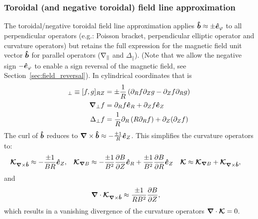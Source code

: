 
\subsubsection{Toroidal (and negative toroidal) field line approximation}\label{sec:torfieldlineapprox}
The toroidal/negative toroidal field line approximation applies \(\bm{\hat{b}}\approx \pm \bm{\hat{e}}_\varphi\) to all perpendicular operators
(e.g.: Poisson bracket, perpendicular elliptic operator and curvature operators)
but retains the full expression for the magnetic field unit vector \(\bm{\hat{b}}\)
for parallel operators (\(\nabla_\parallel\) and \(\Delta_\parallel\)).
(Note that we allow the negative sign $-\bm{\hat{e}}_\varphi$ to enable a sign reversal of the magnetic field, see Section~\ref{sec:field_reversal}).
In cylindrical coordinates that is
\begin{align}
[f,g]_\perp \equiv [f,g]_{RZ} &= \pm\frac{1}{R} \left(\partial_R f\partial_Z g - \partial_Z f\partial_R g\right) \\
\np f &= \partial_R f \ehat_R + \partial_Z f \ehat_Z \\
\Delta_\perp f &= \frac{1}{R}\partial_R \left( R \partial_R f\right) + \partial_Z(\partial_Z f)
\label{}
\end{align}
The curl of $\bm{\hat{b}}$ reduces to
 ${\boldsymbol{\nabla}}\times\bm{\hat{b}} \approx -  \frac{\pm 1}{R} \bm{\hat{e}}_Z$.
This simplifies the curvature operators to:
\begin{align}
{\boldsymbol{\mathcal{K}}}_{{{\boldsymbol{\nabla}}\times\bm{\hat{b}}}}  &\approx  -  \frac{\pm 1}{B R} \bm{\hat{e}}_Z , &
{\boldsymbol{ \mathcal{K} }}_{{\boldsymbol{\nabla}}  B}  &\approx  -\frac{\pm 1}{B^2}\frac{\partial B}{\partial Z}\bm{\hat{e}}_R +\frac{\pm 1}{B^2} \frac{\partial B}{\partial R}\bm{\hat{e}}_Z &
{\boldsymbol{ \mathcal{K} }} &\approx {\boldsymbol{ \mathcal{K} }}_{{\boldsymbol{\nabla}}  B}  +{\boldsymbol{ \mathcal{K} }}_{{{\boldsymbol{\nabla}}\times\bm{\hat{b}}}} ,
\end{align}
and
\begin{align}
 {\boldsymbol{\nabla}}\cdot {\boldsymbol{\mathcal{K}}}_{{{\boldsymbol{\nabla}}\times\bm{\hat{b}}}} &\approx \frac{\pm 1}{R B^2} \frac{\partial B}{\partial Z},
\end{align}
which results in a vanishing divergence of the curvature operators \( {\boldsymbol{\nabla}}\cdot {\boldsymbol{ \mathcal{K} }} = 0\).

